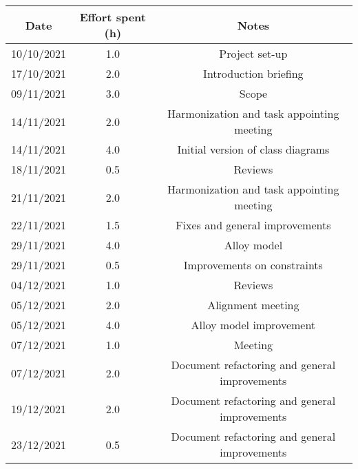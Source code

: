 \documentclass[../../main.tex]{subfiles}
\begin{document}
\begin{center}
    \begin{tabular}{|c| |c| |c|} 
        \hline
        Date & Effort spent (h) & Notes\\ [0.5ex] 
        \hline\hline
        10/10/2021 & 1.0 & Project set-up\\ 
        17/10/2021 & 2.0 & Introduction briefing\\ 
        09/11/2021 & 3.0 & Scope\\ 
        14/11/2021 & 2.0 & Harmonization and task appointing meeting\\
        14/11/2021 & 4.0 & Initial version of class diagrams\\
        18/11/2021 & 0.5 & Reviews\\
        21/11/2021 & 2.0 & Harmonization and task appointing meeting\\
        22/11/2021 & 1.5 & Fixes and general improvements\\
        29/11/2021 & 4.0 & Alloy model\\
        29/11/2021 & 0.5 & Improvements on constraints\\
        04/12/2021 & 1.0 & Reviews\\
        05/12/2021 & 2.0 & Alignment meeting\\
        05/12/2021 & 4.0 & Alloy model improvement\\
        07/12/2021 & 1.0 & Meeting\\
        07/12/2021 & 2.0 & Document refactoring and general improvements\\
        19/12/2021 & 2.0 & Document refactoring and general improvements\\
        23/12/2021 & 0.5 & Document refactoring and general improvements\\
        \hline
    \end{tabular}
\end{center}
\end{document}
